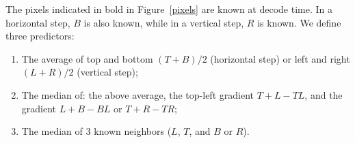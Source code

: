 \documentclass{article}
\begin{document}
\label{sec:prediction_interlacing}
The pixels indicated in bold in Figure~\ref{pixels} are known
at decode time. In a horizontal step, $B$ is also known, while in
a vertical step, $R$ is known.
We define three predictors:
\begin{enumerate}
\item The average of top and bottom $(T+B)/2$ (horizontal step) or
left and right $(L+R)/2$ (vertical step);
\item The median of: the above average,
the top-left gradient $T+L-TL$, and
the gradient $L+B-BL$ or $T+R-TR$;
\item The median of 3 known neighbors ($L$, $T$, and $B$ or $R$).
\end{enumerate}
%
\end{document}
